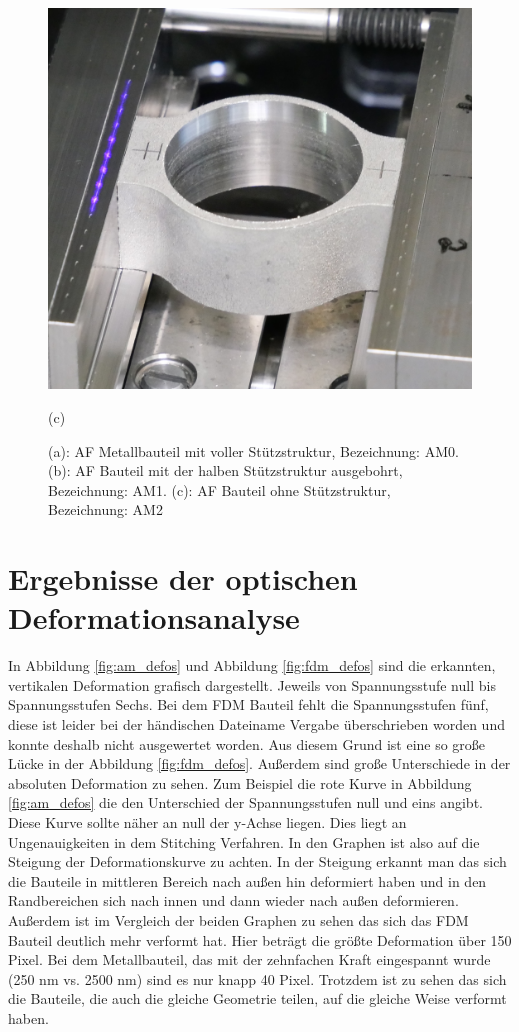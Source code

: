 \begin{figure}[H]
\begin{minipage}{.33\textwidth}
        \centering
        \includegraphics[width=0.9\linewidth]{images/AM2_crop.JPG}
        \caption*{(c)}
      \end{minipage}
      \caption{(a): AF Metallbauteil mit voller Stützstruktur, Bezeichnung: AM0.
      (b): AF Bauteil mit der halben Stützstruktur ausgebohrt, Bezeichnung: AM1.
      (c): AF Bauteil ohne Stützstruktur, Bezeichnung: AM2}
      \label{fig:am_parts}
\end{figure}

\section{Ergebnisse der optischen Deformationsanalyse}

In Abbildung \ref{fig:am_defos} und Abbildung \ref{fig:fdm_defos} sind die erkannten,
vertikalen Deformation grafisch dargestellt. Jeweils von Spannungsstufe null bis 
Spannungsstufen Sechs. Bei dem FDM Bauteil fehlt die Spannungsstufen fünf, 
diese ist leider bei der händischen Dateiname Vergabe überschrieben worden und konnte 
deshalb nicht ausgewertet worden. Aus diesem Grund ist eine so große Lücke in der 
Abbildung \ref{fig:fdm_defos}.
Außerdem sind große Unterschiede in der absoluten Deformation zu sehen. Zum Beispiel 
die rote Kurve in Abbildung \ref{fig:am_defos} die den Unterschied der Spannungsstufen 
null und eins angibt. Diese Kurve sollte näher an null der y-Achse liegen. 
Dies liegt an Ungenauigkeiten in dem Stitching Verfahren. In den Graphen ist also 
auf die Steigung der Deformationskurve zu achten. In der Steigung erkannt man das 
sich die Bauteile in mittleren Bereich nach außen hin deformiert haben und in 
den Randbereichen sich nach innen und dann wieder nach außen deformieren.
Außerdem ist im Vergleich der beiden Graphen zu sehen das sich das FDM Bauteil deutlich 
mehr verformt hat. Hier beträgt die größte Deformation über 150 Pixel.
Bei dem Metallbauteil, das mit der zehnfachen Kraft eingespannt wurde (250 nm vs. 2500 nm)
sind es nur knapp 40 Pixel. Trotzdem ist zu sehen das sich die Bauteile, die auch die 
gleiche Geometrie teilen, auf die gleiche Weise verformt haben.

